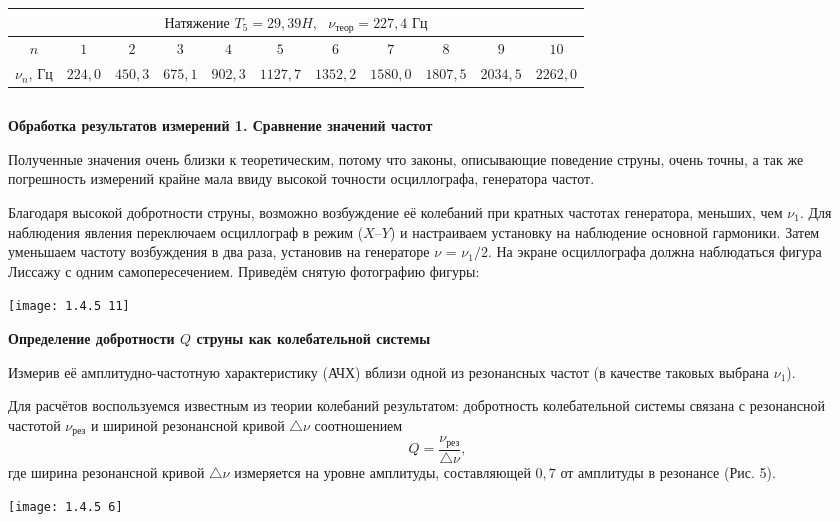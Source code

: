 \documentclass[a4paper,12pt]{article} %
\begin{document}
\begin{center}
\begin{tabular}{|c|c|c|c|c|c|c|c|c|c|c|}
\hline 
\multicolumn{11}{|c|}{$\textbf{Натяжение } T_5 = 29,39H, \text{ } \nu_{\text{теор}} = 227,4 \text{ Гц}$} \\ 
\hline 
$n$ & $1$ & $2$ & $3$ & $4$ & $5$ & $6$ & $7$ & $8$ & $9$ & $10$ \\ 
\hline 
$\nu_n$, Гц & $224,0$ & $450,3$ & $675,1$ & $902,3$ & $1127,7$ & $1352,2$ & $1580,0$ & $1807,5$ & $2034,5$& $2262,0$\\
\hline
\end{tabular} 
\end{center}
\[\]

{\bf Обработка результатов измерений 1. Сравнение значений частот}

Полученные значения очень близки к теоретическим, потому что законы, описывающие поведение струны, очень точны, а так же погрешность измерений крайне мала ввиду высокой точности осциллографа, генератора частот.

Благодаря высокой добротности струны, возможно возбуждение её
колебаний при кратных частотах генератора, меньших, чем $\nu_1$. Для наблюдения явления переключаем осциллограф в режим ($X$--$Y$) и настраиваем установку
на наблюдение основной гармоники. Затем уменьшаем частоту возбуждения
в два раза, установив на генераторе $\nu$ = $\nu_1/2$. На экране осциллографа должна
наблюдаться фигура Лиссажу с одним самопересечением. Приведём снятую фотографию фигуры:

\begin{center}
\texttt{[image: 1.4.5 11]}
\end{center}

{\bf Определение добротности $Q$ струны как колебательной системы}

Измерив её амплитудно-частотную характеристику (АЧХ) вблизи одной из резонансных частот (в качестве таковых выбрана $\nu_1$).

Для расчётов воспользуемся известным из теории колебаний результатом:
добротность колебательной системы связана с резонансной частотой $\nu_{\textbf{рез}}$ и шириной резонансной кривой $\bigtriangleup \nu$ соотношением \[ Q = \frac{\nu_{\textbf{рез}}}{\bigtriangleup \nu} , \]
где ширина резонансной кривой $\bigtriangleup \nu$ измеряется на уровне амплитуды, составляющей $0,7$ от амплитуды в резонансе
(Рис. 5).

\begin{center}
\texttt{[image: 1.4.5 6]}
\end{center}
\end{document}
